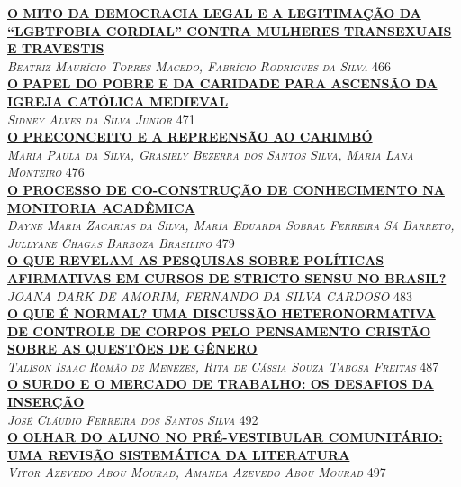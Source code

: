\noindent \textsc{\hyperlink{trabalhos/248119.pdf.1}{\textbf{O MITO DA DEMOCRACIA LEGAL E A LEGITIMAÇÃO DA “LGBTFOBIA CORDIAL” CONTRA MULHERES TRANSEXUAIS E TRAVESTIS}}}\\ 
\noindent \textsc{\textit{Beatriz Maurício Torres Macedo, Fabrício Rodrigues da Silva}} \hfill 466\\ 

\noindent \textsc{\hyperlink{trabalhos/251700.pdf.1}{\textbf{O PAPEL DO POBRE E DA CARIDADE PARA ASCENSÃO DA IGREJA CATÓLICA MEDIEVAL}}}\\ 
\noindent \textsc{\textit{Sidney Alves da Silva Junior}} \hfill 471\\ 

\noindent \textsc{\hyperlink{trabalhos/245106.pdf.1}{\textbf{O PRECONCEITO E A REPREENSÃO AO CARIMBÓ }}}\\ 
\noindent \textsc{\textit{Maria Paula da Silva, Grasiely Bezerra dos Santos Silva, Maria Lana Monteiro}} \hfill 476\\ 

\noindent \textsc{\hyperlink{trabalhos/251121.pdf.1}{\textbf{O PROCESSO DE CO-CONSTRUÇÃO DE CONHECIMENTO NA MONITORIA ACADÊMICA}}}\\ 
\noindent \textsc{\textit{Dayne Maria Zacarias da Silva, Maria Eduarda Sobral Ferreira Sá Barreto, Jullyane Chagas Barboza Brasilino}} \hfill 479\\ 

\noindent \textsc{\hyperlink{trabalhos/250298.pdf.1}{\textbf{O QUE REVELAM AS PESQUISAS SOBRE POLÍTICAS AFIRMATIVAS EM CURSOS DE STRICTO SENSU NO BRASIL?}}}\\ 
\noindent \textsc{\textit{JOANA DARK DE AMORIM, FERNANDO DA SILVA CARDOSO}} \hfill 483\\ 

\noindent \textsc{\hyperlink{trabalhos/250294.pdf.1}{\textbf{O QUE É NORMAL? UMA DISCUSSÃO HETERONORMATIVA DE CONTROLE DE CORPOS PELO PENSAMENTO CRISTÃO SOBRE AS QUESTÕES DE GÊNERO}}}\\ 
\noindent \textsc{\textit{Talison Isaac Romão de Menezes, Rita de Cássia Souza Tabosa Freitas}} \hfill 487\\ 

\noindent \textsc{\hyperlink{trabalhos/248762.pdf.1}{\textbf{O SURDO E O MERCADO DE TRABALHO: OS DESAFIOS DA INSERÇÃO  }}}\\ 
\noindent \textsc{\textit{José Cláudio Ferreira dos Santos Silva}} \hfill 492\\ 

\noindent \textsc{\hyperlink{trabalhos/251777.pdf.1}{\textbf{O OLHAR DO ALUNO NO PRÉ-VESTIBULAR COMUNITÁRIO: UMA REVISÃO SISTEMÁTICA DA LITERATURA}}}\\ 
\noindent \textsc{\textit{Vitor Azevedo Abou Mourad, Amanda Azevedo Abou Mourad}} \hfill 497\\ 

